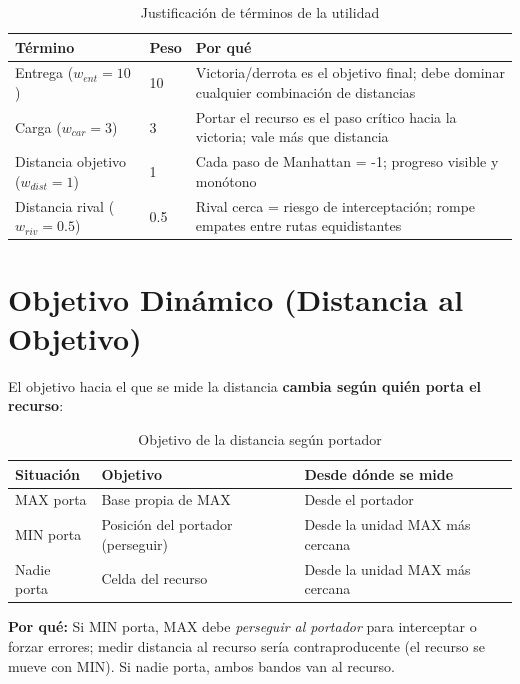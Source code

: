 \begin{table}[H]
\centering
\caption{Justificación de términos de la utilidad}
\begin{tabular}{llp{6cm}}
\toprule
\textbf{Término} & \textbf{Peso} & \textbf{Por qué} \\
\midrule
Entrega ($w_{ent}=10$) & 10 & Victoria/derrota es el objetivo final; debe dominar cualquier combinación de distancias \\
Carga ($w_{car}=3$) & 3 & Portar el recurso es el paso crítico hacia la victoria; vale más que distancia \\
Distancia objetivo ($w_{dist}=1$) & 1 & Cada paso de Manhattan = -1; progreso visible y monótono \\
Distancia rival ($w_{riv}=0.5$) & 0.5 & Rival cerca = riesgo de interceptación; rompe empates entre rutas equidistantes \\
\bottomrule
\end{tabular}
\end{table}
\label{tab:justificacion-utilidad}


\section{Objetivo Dinámico (Distancia al Objetivo)}
\label{sec:objetivo-dinamico}

El objetivo hacia el que se mide la distancia \textbf{cambia según quién porta el recurso}:

\begin{table}[H]
\centering
\caption{Objetivo de la distancia según portador}
\begin{tabular}{lll}
\toprule
\textbf{Situación} & \textbf{Objetivo} & \textbf{Desde dónde se mide} \\
\midrule
MAX porta & Base propia de MAX & Desde el portador \\
MIN porta & Posición del portador (perseguir) & Desde la unidad MAX más cercana \\
Nadie porta & Celda del recurso & Desde la unidad MAX más cercana \\
\bottomrule
\end{tabular}
\end{table}
\label{tab:objetivo-dinamico}


\textbf{Por qué:} Si MIN porta, MAX debe \textit{perseguir al portador} para interceptar o
forzar errores; medir distancia al recurso sería contraproducente (el recurso se mueve con
MIN). Si nadie porta, ambos bandos van al recurso.

